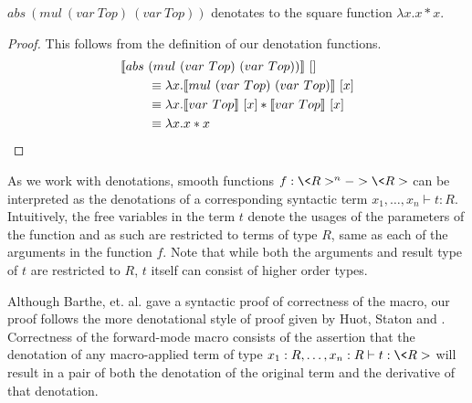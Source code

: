   \begin{example}[Square]
    $abs\ (mul\ (var\ Top)\ (var\ Top))$ denotates to the square function $\lambda x. x * x$.
    \begin{proof}
      This follows from the definition of our denotation functions.
      \begin{align*}
        \llbracket abs\ &(mul\ (var\ Top)\ (var\ Top)) \rrbracket\ [] \\
          &\equiv \lambda x.
            \llbracket mul\ (var\ Top)\ (var\ Top) \rrbracket\ [x] \\
          &\equiv \lambda x.
            \llbracket var\ Top \rrbracket\ [x] *
              \llbracket var\ Top \rrbracket\ [x] \\
          &\equiv \lambda x. x * x \qedhere
      \end{align*}
    \end{proof}
  \end{example}


  As we work with denotations, smooth functions $f : \<R>^n -> \<R>$ can be interpreted as the denotations of a corresponding syntactic term $x_1, \dots, x_n \vdash t : R$.
  Intuitively, the free variables in the term $t$ denote the usages of the parameters of the function and as such are restricted to terms of type $R$, same as each of the arguments in the function $f$.
  Note that while both the arguments and result type of $t$ are restricted to $R$, $t$ itself can consist of higher order types.

  Although Barthe, et. al.\cite{barthe2020versatility} gave a syntactic proof of correctness of the macro, our proof follows the more denotational style of proof given by Huot, Staton and \Vakar{}\cite{huot2020correctness}.
  Correctness of the forward-mode macro consists of the assertion that the denotation of any macro-applied term of type $x_1 : R, \dots, x_n : R \vdash t : \<R>$ will result in a pair of both the denotation of the original term and the derivative of that denotation.

